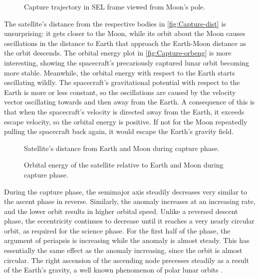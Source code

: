 \begin{figure}
\centering
\def\svgwidth{\figurewidth}

\caption{Capture trajectory in SEL frame viewed from Moon's pole.}
\label{fig:Capture-3D-sel}
\end{figure}

%

The satellite's distance from the respective bodies in \autoref{fig:Capture-dist} is unsurprising: it gets closer to the Moon, while its orbit about the Moon causes oscillations in the distance to Earth that approach the Earth-Moon distance as the orbit descends. The orbital energy plot in \autoref{fig:Capture-orbeng} is more interesting, showing the spacecraft's precariously captured lunar orbit becoming more stable. Meanwhile, the orbital energy with respect to the Earth starts oscillating wildly. The spacecraft's gravitational potential with respect to the Earth is more or less constant, so the oscillations are caused by the velocity vector oscillating towards and then away from the Earth. A consequence of this is that when the spacecraft's velocity is directed away from the Earth, it exceeds escape velocity, so the orbital energy is positive. If not for the Moon repeatedly pulling the spacecraft back again, it would escape the Earth's gravity field.

\begin{figure}
\centering
\def\svgwidth{\figurewidth}

\caption{Satellite's distance from Earth and Moon during capture phase.}
\label{fig:Capture-dist}
\end{figure}

\begin{figure}
\centering
\def\svgwidth{\figurewidth}

\caption{Orbital energy of the satellite relative to Earth and Moon during capture phase.}
\label{fig:Capture-orbeng}
\end{figure}

During the capture phase, the semimajor axis steadily decreases very similar to the ascent phase in reverse. Similarly, the anomaly increases at an increasing rate, and the lower orbit results in higher orbital speed. Unlike a reversed descent phase, the eccentricity continues to decrease until it reaches a very nearly circular orbit, as required for the science phase. For the first half of the phase, the argument of periapsis is increasing while the anomaly is almost steady. This has essentially the same effect as the anomaly increasing, since the orbit is almost circular. The right ascension of the ascending node precesses steadily as a result of the Earth's gravity, a well known phenomenon of polar lunar orbits \parencite{Gupta2011}. %


